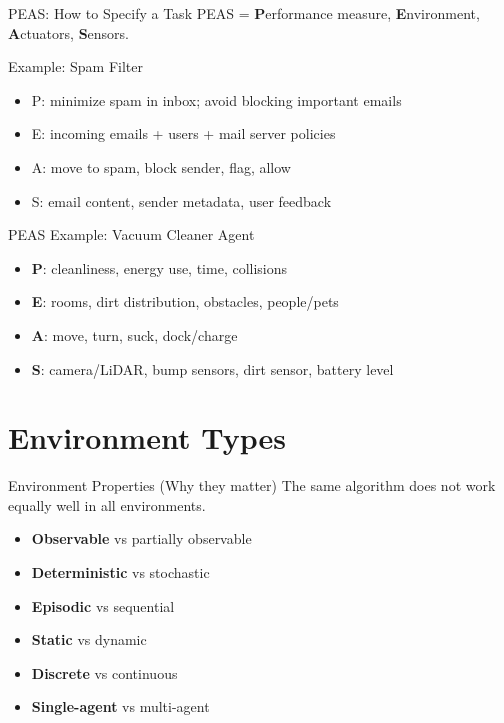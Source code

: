\documentclass[aspectratio=169]{beamer}
\begin{document}
\begin{frame}{PEAS: How to Specify a Task}
  PEAS = \textbf{P}erformance measure, \textbf{E}nvironment, \textbf{A}ctuators, \textbf{S}ensors.
  \vspace{0.6em}
  \begin{exampleblock}{Example: Spam Filter}
    \begin{itemize}
      \item P: minimize spam in inbox; avoid blocking important emails
      \item E: incoming emails + users + mail server policies
      \item A: move to spam, block sender, flag, allow
      \item S: email content, sender metadata, user feedback
    \end{itemize}
  \end{exampleblock}
\end{frame}

\begin{frame}{PEAS Example: Vacuum Cleaner Agent}
  \begin{itemize}[<+->]
    \item \textbf{P}: cleanliness, energy use, time, collisions
    \item \textbf{E}: rooms, dirt distribution, obstacles, people/pets
    \item \textbf{A}: move, turn, suck, dock/charge
    \item \textbf{S}: camera/LiDAR, bump sensors, dirt sensor, battery level
  \end{itemize}
\end{frame}

\section{Environment Types}
\label{sec:env}

\begin{frame}{Environment Properties (Why they matter)}
  The same algorithm does not work equally well in all environments.
  \vspace{0.4em}
  \begin{itemize}[<+->]
    \item \textbf{Observable} vs partially observable
    \item \textbf{Deterministic} vs stochastic
    \item \textbf{Episodic} vs sequential
    \item \textbf{Static} vs dynamic
    \item \textbf{Discrete} vs continuous
    \item \textbf{Single-agent} vs multi-agent
  \end{itemize}
\end{frame}
\end{document}
